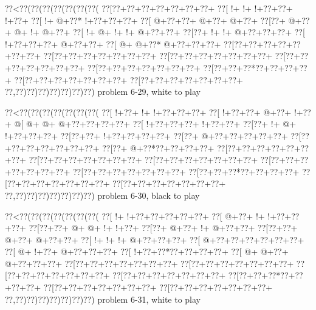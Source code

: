 \vbox{\vbox{\goo
\0??<\0??(\0??(\0??(\0??(\0??(\0??(\0??(
\0??[\0??+\0??+\0??+\0??+\0??+\0??+\0??+
\0??[\- !+\- !+\- !+\0??+\0??+\- !+\0??+
\0??[\- !+\- @+\0??*\- !+\0??+\0??+\0??+
\0??[\- @+\0??+\0??+\- @+\0??+\- @+\0??+
\0??[\0??+\- @+\0??+\- @+\- !+\- @+\0??+
\0??[\- !+\- @+\- !+\- !+\- @+\0??+\0??+
\0??[\0??+\- !+\- !+\- @+\0??+\0??+\0??+
\0??[\- !+\0??+\0??+\0??+\- @+\0??+\0??+
\0??[\- @+\- @+\0??*\- @+\0??+\0??+\0??+
\0??[\0??+\0??+\0??+\0??+\0??+\0??+\0??+
\0??[\0??+\0??+\0??+\0??+\0??+\0??+\0??+
\0??[\0??+\0??+\0??+\0??+\0??+\0??+\0??+
\0??[\0??+\0??+\0??+\0??+\0??+\0??+\0??+
\0??[\0??+\0??+\0??+\0??+\0??+\0??+\0??+
\0??[\0??+\0??+\0??*\0??+\0??+\0??+\0??+
\0??[\0??+\0??+\0??+\0??+\0??+\0??+\0??+
\0??[\0??+\0??+\0??+\0??+\0??+\0??+\0??+
\0??,\0??)\0??)\0??)\0??)\0??)\0??)\0??)
}
\hfil problem 6-29, white to play\hfil\break
}

\vbox{\vbox{\goo
\0??<\0??(\0??(\0??(\0??(\0??(\0??(\0??(
\0??[\- !+\0??+\- !+\- !+\0??+\0??+\0??+
\0??[\- !+\0??+\0??+\- @+\0??+\- !+\0??+
\- @[\- @+\- @+\- @+\0??+\0??+\0??+\0??+
\0??[\- !+\0??+\0??+\0??+\- !+\0??+\0??+
\0??[\0??+\- !+\- @+\- !+\0??+\0??+\0??+
\0??[\0??+\0??+\- !+\0??+\0??+\0??+\0??+
\0??[\0??+\- @+\0??+\0??+\0??+\0??+\0??+
\0??[\0??+\0??+\0??+\0??+\0??+\0??+\0??+
\0??[\0??+\- @+\0??*\0??+\0??+\0??+\0??+
\0??[\0??+\0??+\0??+\0??+\0??+\0??+\0??+
\0??[\0??+\0??+\0??+\0??+\0??+\0??+\0??+
\0??[\0??+\0??+\0??+\0??+\0??+\0??+\0??+
\0??[\0??+\0??+\0??+\0??+\0??+\0??+\0??+
\0??[\0??+\0??+\0??+\0??+\0??+\0??+\0??+
\0??[\0??+\0??+\0??*\0??+\0??+\0??+\0??+
\0??[\0??+\0??+\0??+\0??+\0??+\0??+\0??+
\0??[\0??+\0??+\0??+\0??+\0??+\0??+\0??+
\0??,\0??)\0??)\0??)\0??)\0??)\0??)\0??)
}
\hfil problem 6-30, black to play\hfil\break
}

\vbox{\vbox{\goo
\0??<\0??(\0??(\0??(\0??(\0??(\0??(\0??(
\0??[\- !+\- !+\0??+\0??+\0??+\0??+\0??+
\0??[\- @+\0??+\- !+\- !+\0??+\0??+\0??+
\0??[\0??+\0??+\- @+\- @+\- !+\- !+\0??+
\0??[\0??+\- @+\0??+\- !+\- @+\0??+\0??+
\0??[\0??+\0??+\- @+\0??+\- @+\0??+\0??+
\0??[\- !+\- !+\- !+\- @+\0??+\0??+\0??+
\0??[\- @+\0??+\0??+\0??+\0??+\0??+\0??+
\0??[\- @+\- !+\0??+\- @+\0??+\0??+\0??+
\0??[\- !+\0??+\0??*\0??+\0??+\0??+\0??+
\0??[\- @+\- @+\0??+\- @+\0??+\0??+\0??+
\0??[\0??+\0??+\0??+\0??+\0??+\0??+\0??+
\0??[\0??+\0??+\0??+\0??+\0??+\0??+\0??+
\0??[\0??+\0??+\0??+\0??+\0??+\0??+\0??+
\0??[\0??+\0??+\0??+\0??+\0??+\0??+\0??+
\0??[\0??+\0??+\0??*\0??+\0??+\0??+\0??+
\0??[\0??+\0??+\0??+\0??+\0??+\0??+\0??+
\0??[\0??+\0??+\0??+\0??+\0??+\0??+\0??+
\0??,\0??)\0??)\0??)\0??)\0??)\0??)\0??)
}
\hfil problem 6-31, white to play\hfil\break
}


